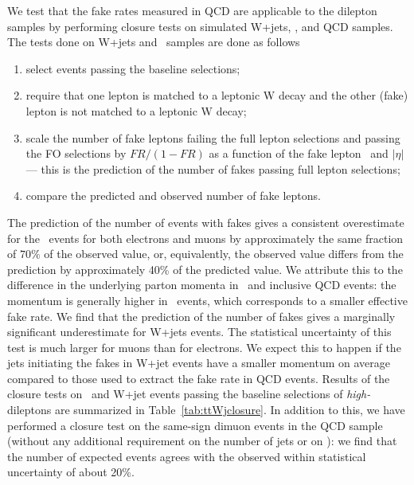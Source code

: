 We test that the fake rates measured in QCD are applicable to the dilepton samples by performing closure
tests on simulated W+jets, \ttbar, and QCD samples.
The tests done on W+jets and \ttbar\ samples are done as follows
\begin{enumerate}
\item select events passing the baseline selections;
\item require that one lepton is matched to a leptonic W decay and the other (fake) lepton is not
matched to a leptonic W decay;
\item scale the number of fake leptons failing the full lepton selections and passing the FO selections
	by $FR/(1-FR)$ as a function of the fake lepton \pt\ and $|\eta|$ --- this is the prediction
	of the number of fakes passing full lepton selections;
\item compare the predicted and observed number of fake leptons.
\end{enumerate}
The prediction of the number of events with fakes gives a consistent overestimate for the \ttbar\ events
for both electrons and muons by approximately the same fraction of  $70\%$ of the observed value,
or, equivalently, the observed value differs from the prediction by approximately  40\% of the predicted value.
We attribute this to the difference in the underlying parton momenta in \ttbar\ and inclusive QCD events:
the momentum is generally higher in \ttbar\ events, which corresponds to a smaller effective fake rate.
We find that the prediction of the number of fakes gives a marginally significant underestimate 
for W+jets events.
The statistical uncertainty of this test  is much larger for muons than for electrons.
We expect this to happen if the jets initiating the fakes in W+jet events have a smaller momentum on average
compared to those used to extract the fake rate in QCD events.
Results of the closure tests on \ttbar\ and W+jet events passing the baseline selections of {\em high-\pt}
 dileptons are summarized in Table~\ref{tab:ttWjclosure}.
In addition to this, we have performed a closure test on the same-sign dimuon events in the QCD sample
(without any additional requirement on the number of jets or on \met):
we find that the number of expected events agrees with the  observed within statistical uncertainty of about 20\%.

